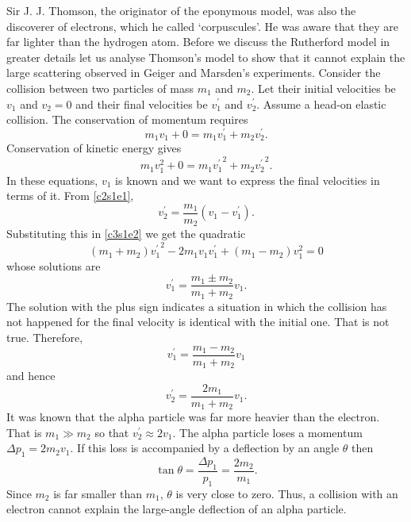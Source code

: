 Sir J. J. Thomson, the originator of the eponymous model, was also the 
discoverer of electrons, which he called `corpuscules'. He was aware that 
they are far lighter than the hydrogen atom. Before we discuss the Rutherford
model in greater details let us analyse Thomson's model to show that it cannot
explain the large scattering observed in Geiger and Marsden's experiments. 
Consider the collision between two particles of mass $m_1$ and $m_2$. Let their
initial velocities be $v_1$ and $v_2 = 0$ and their final velocities be 
$v_1^\prime$ and $v_2^\prime$. Assume a head-on elastic collision. The 
conservation of momentum requires
\begin{equation}\label{c3s1e1}
m_1v_1 + 0 = m_1v_1^\prime + m_2v_2^\prime.
\end{equation}
Conservation of kinetic energy gives
\begin{equation}\label{c3s1e2}
m_1v_1^2 + 0 = m_1{v_1^\prime}^2 + m_2{v_2^\prime}^2.
\end{equation}
In these equations, $v_1$ is known and we want to express the final velocities
in terms of it. From \eqref{c2s1e1},
\begin{equation}\label{c3s1e3}
v_2^\prime = \frac{m_1}{m_2}(v_1 - v_1^\prime).
\end{equation}
Substituting this in \eqref{c3s1e2} we get the quadratic
\begin{equation}\label{c3s1e4}
(m_1 + m_2){v_1^\prime}^2 - 2m_1v_1v_1^\prime + (m_1 - m_2)v_1^2 = 0
\end{equation}
whose solutions are
\begin{equation}\label{c3s1e5}
v_1^\prime = \frac{m_1 \pm m_2}{m_1 + m_2}v_1.
\end{equation}
The solution with the plus sign indicates a situation in which the collision
has not happened for the final velocity is identical with the initial one. That
is not true. Therefore,
\begin{equation}\label{c3s1e6}
v_1^\prime = \frac{m_1 - m_2}{m_1 + m_2}v_1
\end{equation}
and hence
\begin{equation}\label{c3s1e7}
v_2^\prime = \frac{2m_1}{m_1 + m_2}v_1.
\end{equation}
It was known that the alpha particle was far more heavier than the electron.
That is $m_1 \gg m_2$ so that $v_2^\prime \approx 2v_1$. The alpha particle
loses a momentum $\Delta p_1 = 2m_2v_1$. If this loss is accompanied by a 
deflection by an angle $\theta$ then
\begin{equation}\label{c3s1e8}
\tan\theta = \frac{\Delta p_1}{p_1} = \frac{2m_2}{m_1}.
\end{equation}
Since $m_2$ is far smaller than $m_1$, $\theta$ is very close to zero. Thus,
a collision with an electron cannot explain the large-angle deflection of an
alpha particle.

